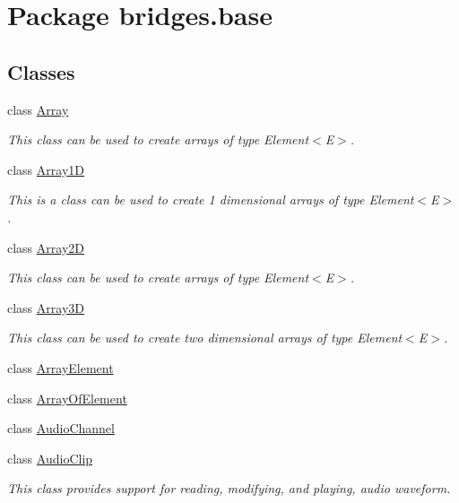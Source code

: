 \hypertarget{namespacebridges_1_1base}{}\section{Package bridges.\+base}
\label{namespacebridges_1_1base}
\subsection*{Classes}
\begin{DoxyCompactItemize}
\item 
class \hyperlink{classbridges_1_1base_1_1_array}{Array}
\begin{DoxyCompactList}\small\item\em This class can be used to create arrays of type Element$<$\+E$>$. \end{DoxyCompactList}\item 
class \hyperlink{classbridges_1_1base_1_1_array1_d}{Array1D}
\begin{DoxyCompactList}\small\item\em This is a class can be used to create 1 dimensional arrays of type Element$<$\+E$>$. \end{DoxyCompactList}\item 
class \hyperlink{classbridges_1_1base_1_1_array2_d}{Array2D}
\begin{DoxyCompactList}\small\item\em This class can be used to create arrays of type Element$<$\+E$>$. \end{DoxyCompactList}\item 
class \hyperlink{classbridges_1_1base_1_1_array3_d}{Array3D}
\begin{DoxyCompactList}\small\item\em This class can be used to create two dimensional arrays of type Element$<$\+E$>$. \end{DoxyCompactList}\item 
class \hyperlink{classbridges_1_1base_1_1_array_element}{Array\+Element}
\item 
class \hyperlink{classbridges_1_1base_1_1_array_of_element}{Array\+Of\+Element}
\item 
class \hyperlink{classbridges_1_1base_1_1_audio_channel}{Audio\+Channel}
\item 
class \hyperlink{classbridges_1_1base_1_1_audio_clip}{Audio\+Clip}
\begin{DoxyCompactList}\small\item\em This class provides support for reading, modifying, and playing, audio waveform. \end{DoxyCompactList}\item 

\end{DoxyCompactItemize}
